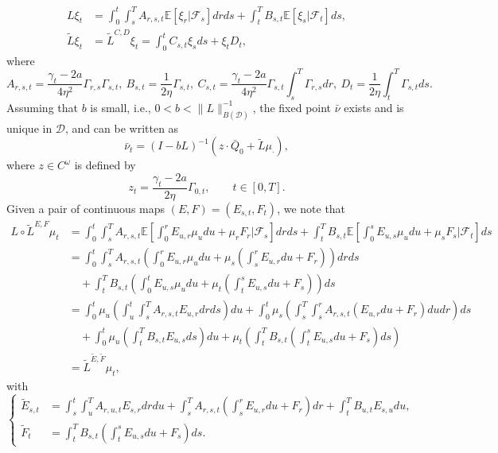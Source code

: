 \documentclass[10pt]{article}
\begin{document}
\begin{align}\label{defLtildeL}
    L\xi_t &=  \int_0^t \int_s^T  A_{r,s,t} \mathbb{E}[\xi_r | \mathcal{F}_s] dr ds 
    + \int_t^T B_{s,t} \mathbb{E}[\xi_s | \mathcal{F}_t] ds, \\
    \tilde{L}\xi_t &= \tilde{L}^{C,D}\xi_t = \int_0^t C_{s,t} \xi_s ds + \xi_t D_t,
\end{align}
where
\[
A_{r,s,t} = \frac {\gamma_t - 2a}{4\eta^2} \Gamma_{r,s} \Gamma_{s,t},~ 
B_{s,t} = \frac{1}{2\eta} \Gamma_{s,t},~ 
C_{s,t} = \frac{\gamma_t - 2a}{4\eta^2} \Gamma_{s,t} \int_s^T \Gamma_{r,s} dr,~ 
D_t = \frac{1}{2\eta} \int_t^T \Gamma_{s,t} ds.
\]
Assuming that $b$ is small, i.e., $0 < b < \|L\|_{B(\mathcal{D})}^{-1}$, the fixed point $\bar{\nu}$ exists and is unique in $\mathcal{D}$, and can be written as 
\begin{equation}\label{defbarnu}
    \bar{\nu}_t = (I - bL)^{-1}(z \cdot \bar{Q}_0 + \tilde{L}\mu_\cdot),
\end{equation}
where $z \in C^\omega$ is defined by 
$$
z_t = \frac{\gamma_t - 2a}{2\eta} \Gamma_{0,t}, \qquad t \in [0,T].
$$
Given a pair of continuous maps $(E,F) = (E_{s,t},F_t)$, we note that 
\begin{align*}
L \circ \tilde{L}^{E,F} \mu_t &=  \int_0^t \int_s^T  A_{r,s,t} \mathbb{E}\left[\int_0^r E_{u,r} \mu_u du + \mu_r F_r \Big| \mathcal{F}_s \right] dr ds 
+ \int_t^T B_{s,t} \mathbb{E}\left[\int_0^s E_{u,s} \mu_u du + \mu_s F_s \Big| \mathcal{F}_t \right] ds \\
&=  \int_0^t \int_s^T  A_{r,s,t} \left( \int_0^r E_{u,r} \mu_u du + \mu_s\left(\int_s^r E_{u,r} du + F_r \right)\right) dr ds \\
&\quad + \int_t^T B_{s,t} \left( \int_0^t E_{u,s} \mu_u du + \mu_t\left(\int_t^s E_{u,s} du + F_s \right)\right) ds \\
&= \int_0^t \mu_u \left( \int_u^t \int_s^T  A_{r,s,t} E_{u,r} dr ds\right) du 
  + \int_0^t \mu_s \left( \int_s^T \int_s^r A_{r,s,t} \left( E_{u,r} du + F_r \right) du dr \right) ds \\
&\quad + \int_0^t \mu_u \left( \int_t^T B_{s,t} E_{u,s} ds\right) du + \mu_t \left( \int_t^T B_{s,t}\left(\int_t^s E_{u,s} du + F_s \right) ds \right) \\
&= \tilde{L}^{\tilde{E},\tilde{F}} \mu_t,
\end{align*}
with 
\begin{equation}\label{defhatL}
\left\{
\begin{array}{ll}
\tilde{E}_{s,t} &= \int_s^t \int_u^T  A_{r,u,t} E_{s,r} dr du + \int_s^T A_{r,s,t}\left( \int_s^r E_{u,r} du + F_r \right) dr + \int_t^T B_{u,t} E_{s,u} du,\\
\tilde{F}_t &= \int_t^T B_{s,t} \left(\int_t^s E_{u,s} du + F_s \right) ds.    
\end{array}
\right.
\end{equation}
\end{document}
